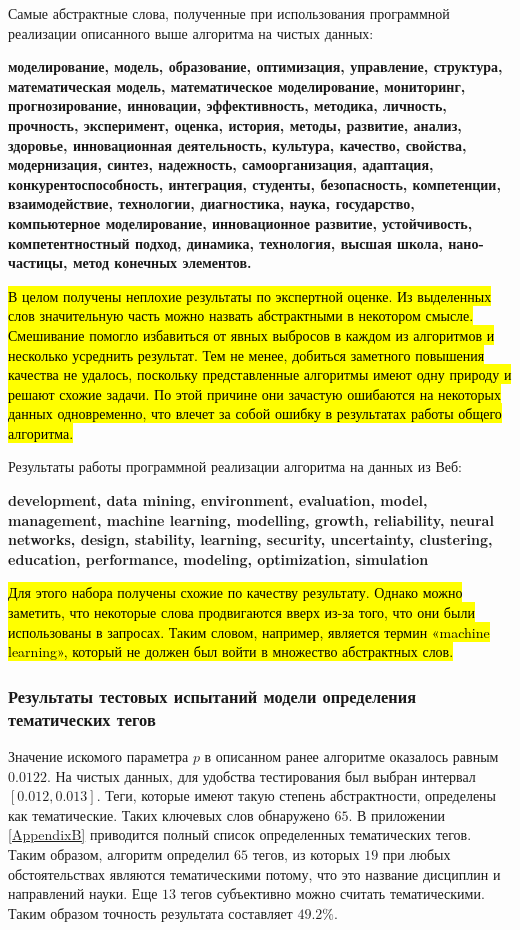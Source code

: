 Самые абстрактные слова, полученные при использования программной реализации описанного выше алгоритма на чистых данных:

\textbf{моделирование, модель, образование, оптимизация, управление, структура, математическая модель, математическое моделирование, мониторинг, прогнозирование, инновации, эффективность, методика, личность, прочность, эксперимент, оценка, история, методы, развитие, анализ, здоровье, инновационная деятельность, культура, качество, свойства, модернизация, синтез, надежность, самоорганизация, адаптация, конкурентоспособность, интеграция, студенты, безопасность, компетенции, взаимодействие, технологии, диагностика, наука, государство, компьютерное моделирование, инновационное развитие, устойчивость, компетентностный подход, динамика, технология, высшая школа, нано-
частицы, метод конечных элементов.}

\hl{В целом получены неплохие результаты по экспертной оценке. Из выделенных слов значительную часть можно назвать абстрактными в некотором смысле. Смешивание помогло избавиться от явных выбросов в каждом из алгоритмов и несколько усреднить результат. Тем не менее, добиться заметного повышения качества не удалось, поскольку представленные алгоритмы имеют одну природу и решают схожие задачи. По этой причине они зачастую ошибаются на некоторых данных одновременно, что влечет за собой ошибку в результатах работы общего алгоритма.}

Результаты работы программной реализации алгоритма на данных из Веб:

\textbf{development, data mining, environment, evaluation, model, management, machine learning, modelling, growth, reliability, neural networks, design, stability, learning, security, uncertainty, clustering, education, performance, modeling, optimization, simulation}

\hl{Для этого набора получены схожие по качеству результату. Однако можно заметить, что некоторые слова продвигаются вверх из-за того, что они были использованы в запросах. Таким словом, например, является термин «machine learning», который не должен был войти в множество абстрактных слов.}

\subsubsection{Результаты тестовых испытаний модели определения тематических тегов}
Значение искомого параметра $p$ в описанном ранее алгоритме оказалось равным $0.0122$.  На чистых данных, для удобства тестирования был выбран интервал $[0.012, 0.013]$. Теги, которые имеют такую степень абстрактности, определены как тематические. Таких ключевых слов обнаружено $65$. В приложении \ref{AppendixB} приводится полный список определенных тематических тегов. Таким образом, алгоритм определил $65$ тегов, из которых $19$ при любых обстоятельствах являются тематическими потому, что это название дисциплин и направлений науки. Еще $13$ тегов субъективно можно считать тематическими. Таким образом точность результата составляет $49.2\%$.

